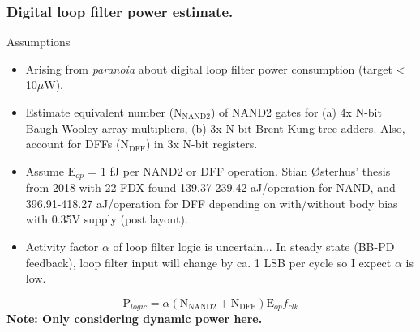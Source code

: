 \documentclass[t, screen, aspectratio=43]{beamer}
\begin{document}
\begin{frame}
	\frametitle{Digital loop filter power estimate.}
	\begin{block}{Assumptions}
		\begin{itemize}[itemsep=4pt,label=\protect---]
			\scriptsize
			\item Arising from \textit{paranoia} about digital loop filter power consumption (target < 10$\mu$W).
			\item Estimate equivalent number ($\textrm{N}_{\mathrm{NAND2}}$) of NAND2 gates for (a) 4x N-bit Baugh-Wooley array multipliers, (b) 3x N-bit Brent-Kung tree adders. Also, account for DFFs ($\textrm{N}_{\mathrm{DFF}}$) in 3x N-bit registers.
			\item Assume $\textrm{E}_{op}$ = 1 fJ per NAND2 or DFF operation. Stian Østerhus' thesis from 2018 with 22-FDX found 139.37-239.42 aJ/operation for NAND, and 396.91-418.27 aJ/operation for DFF depending on with/without body bias with 0.35V supply (post layout).
			\item Activity factor $\alpha$ of loop filter logic is uncertain... In steady state (BB-PD feedback), loop filter input will change by ca. 1 LSB per cycle so I expect $\alpha$ is low.
		\end{itemize} 
		\footnotesize
		\begin{equation}
			\textrm{P}_{logic} = \alpha (\textrm{N}_{\mathrm{NAND2}}+\textrm{N}_{\mathrm{DFF}})\textrm{E}_{op}f_{clk}
		\end{equation}
		\tiny
		\hspace{2em}\vspace{1em}\textbf{Note: Only considering dynamic power here.}
	\end{block}	
\end{frame}
\end{document}
